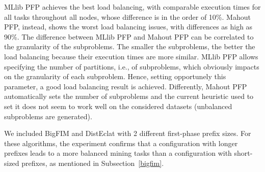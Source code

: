 MLlib PFP achieves the best load balancing, with comparable
execution times for all tasks throughout all nodes,
whose difference is in the order of 10\%.
Mahout PFP, instead, shows the worst load balancing issues,
with differences as high as 90\%. The difference between MLlib PFP and Mahout PFP can be correlated to the 
granularity of the subproblems. The smaller the subproblems, the better the load balancing
because their execution times are more similar. MLlib PFP allows specifying the number of partitions, i.e., of subproblems, which obviously impacts on the 
granularity of each subproblem. Hence, setting opportunely this parameter, a good load balancing result is achieved. Differently, 
Mahout PFP automatically sets the number of subproblems and the current heuristic used to set it does not seem to work well on the considered datasets
(unbalanced subproblems are generated).

We included BigFIM and DistEclat with 2 different
first-phase prefix sizes.
For these algorithms, the experiment confirms that a configuration with longer prefixes
leads to a more balanced mining tasks than a configuration with short-sized prefixes,
as mentioned in Subsection~\ref{bigfim}.
%





